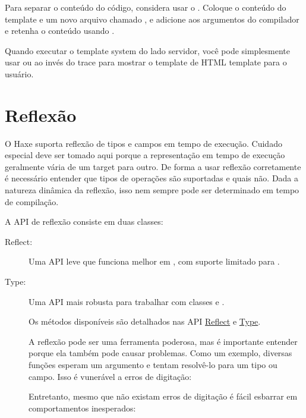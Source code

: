 {Para separar o conteúdo do código, considera usar o . 
Coloque o conteúdo do template e um novo arquivo chamado , e adicione  aos argumentos do compilador e retenha o conteúdo usando .


Quando executar o template system do lado servidor, você pode simplesmente usar  ou  ao invés do trace para mostrar o template de HTML template para o usuário.


\section{Reflexão}
\label{std-reflection}

O Haxe suporta reflexão de tipos e campos em tempo de execução. Cuidado especial deve ser tomado aqui porque a representação em tempo de execução geralmente vária de um target para outro. De forma a usar reflexão corretamente é necessário entender que tipos de operações são suportadas e quais não. Dada a natureza dinâmica da reflexão, isso nem sempre pode ser determinado em tempo de compilação.

A API de reflexão consiste em duas classes:

\begin{description}
    \item[Reflect:] Uma API leve que funciona melhor em , com suporte limitado para . 
    \item[Type:] Uma API mais robusta para trabalhar com classes e .

Os métodos disponíveis são detalhados nas API \href{http://api.haxe.org//Reflect.html}{Reflect} e \href{http://api.haxe.org//Type.html}{Type}.

A reflexão pode ser uma ferramenta poderosa, mas é importante entender porque ela também pode causar problemas. Como um exemplo, diversas funções esperam um argumento   e tentam resolvê-lo para um tipo ou campo. Isso é vunerável a erros de digitação:


Entretanto, mesmo que não existam erros de digitação é fácil esbarrar em comportamentos inesperados:


\end{description}}
